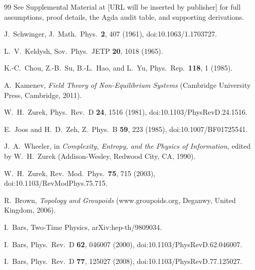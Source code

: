 \documentclass[aps,prl,reprint,floatfix]{revtex4-2}
\theoremstyle{plain}
\theoremstyle{definition}
\begin{document}
\begin{thebibliography}{99}
See Supplemental Material at [URL will be inserted by publisher] for full assumptions, proof details, the Agda audit table, and supporting derivations.

J.~Schwinger, J.\ Math.\ Phys.\ \textbf{2}, 407 (1961), doi:10.1063/1.1703727.

L.~V.~Keldysh, Sov.\ Phys.\ JETP \textbf{20}, 1018 (1965).

K.-C.~Chou, Z.-B.~Su, B.-L.~Hao, and L.~Yu, Phys.\ Rep.\ \textbf{118}, 1 (1985).

A.~Kamenev, \emph{Field Theory of Non-Equilibrium Systems} (Cambridge University Press, Cambridge, 2011).

W.~H.~Zurek, Phys.\ Rev.\ D \textbf{24}, 1516 (1981), doi:10.1103/PhysRevD.24.1516.

E.~Joos and H.~D.~Zeh, Z.\ Phys.\ B \textbf{59}, 223 (1985), doi:10.1007/BF01725541.

J.~A.~Wheeler, in \emph{Complexity, Entropy, and the Physics of Information}, edited by W.~H.~Zurek (Addison-Wesley, Redwood City, CA, 1990).

W.~H.~Zurek, Rev.\ Mod.\ Phys.\ \textbf{75}, 715 (2003), doi:10.1103/RevModPhys.75.715.

R.~Brown, \emph{Topology and Groupoids} (www.groupoids.org, Deganwy, United Kingdom, 2006).

I.~Bars, Two-Time Physics, arXiv:hep-th/9809034.

I.~Bars, Phys.\ Rev.\ D \textbf{62}, 046007 (2000), doi:10.1103/PhysRevD.62.046007.

I.~Bars, Phys.\ Rev.\ D \textbf{77}, 125027 (2008), doi:10.1103/PhysRevD.77.125027.
\end{thebibliography}
\end{document}
